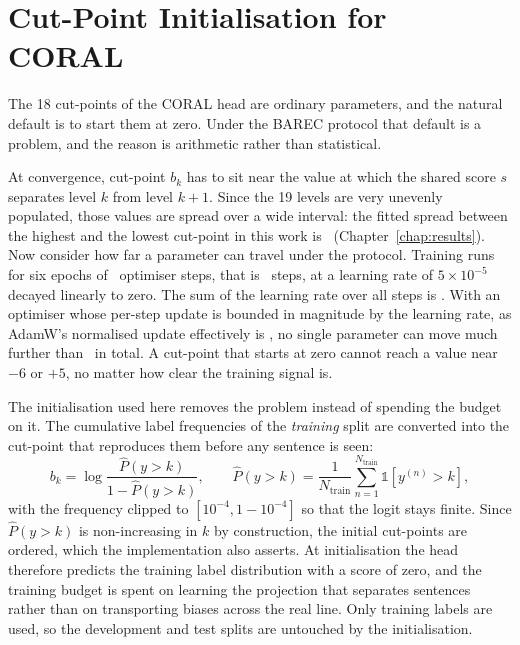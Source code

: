 \section{Cut-Point Initialisation for CORAL}
\label{sec:meth-coral-init}

The 18 cut-points of the CORAL head are ordinary parameters, and the natural default is to
start them at zero. Under the BAREC protocol that default is a problem, and the reason is
arithmetic rather than statistical.

At convergence, cut-point $b_k$ has to sit near the value at which the shared score $s$
separates level $k$ from level $k+1$. Since the 19 levels are very unevenly populated, those
values are spread over a wide interval: the fitted spread between the highest and the lowest
cut-point in this work is \cutSpreadCoral\ (Chapter~\ref{chap:results}). Now consider how far a
parameter can travel under the protocol. Training runs for six epochs of \stepsPerEpoch\
optimiser steps, that is \gpuTotalSteps\ steps, at a learning rate of $5\times10^{-5}$ decayed
linearly to zero. The sum of the learning rate over all steps is \lrSumEncoder. With an
optimiser whose per-step update is bounded in magnitude by the learning rate, as AdamW's
normalised update effectively is \cite{loshchilov2019adamw}, no single parameter can move much
further than \lrSumEncoder\ in total. A cut-point that starts at zero cannot reach a value near
$-6$ or $+5$, no matter how clear the training signal is.

The initialisation used here removes the problem instead of spending the budget on it. The
cumulative label frequencies of the \emph{training} split are converted into the cut-point that
reproduces them before any sentence is seen:
\begin{equation}
b_k = \log \frac{\hat{P}(y>k)}{1-\hat{P}(y>k)}, \qquad
\hat{P}(y>k) = \frac{1}{N_{\text{train}}}\sum_{n=1}^{N_{\text{train}}}\mathbb{1}\left[y^{(n)}>k\right],
\label{eq:coral-init}
\end{equation}
with the frequency clipped to $[10^{-4}, 1-10^{-4}]$ so that the logit stays finite. Since
$\hat{P}(y>k)$ is non-increasing in $k$ by construction, the initial cut-points are ordered,
which the implementation also asserts. At initialisation the head therefore predicts the
training label distribution with a score of zero, and the training budget is spent on learning
the projection that separates sentences rather than on transporting biases across the real
line. Only training labels are used, so the development and test splits are untouched by the
initialisation.

